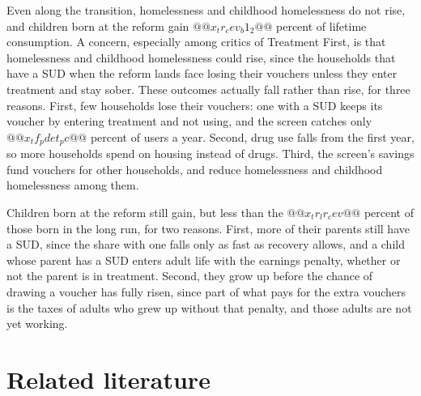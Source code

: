 \documentclass[10pt]{article}
\begin{document}
Even along the transition, homelessness and childhood homelessness do not rise, and children born at the reform gain $@@x_tr_cev_b1_2@@$ percent of lifetime consumption. A concern, especially among critics of Treatment First, is that homelessness and childhood homelessness could rise, since the households that have a SUD when the reform lands face losing their vouchers unless they enter treatment and stay sober. These outcomes actually fall rather than rise, for three reasons. First, few households lose their vouchers: one with a SUD keeps its voucher by entering treatment and not using, and the screen catches only $@@x_tf_pdet_pc@@$ percent of users a year. Second, drug use falls from the first year, so more households spend on housing instead of drugs. Third, the screen's savings fund vouchers for other households, and reduce homelessness and childhood homelessness among them.

Children born at the reform still gain, but less than the $@@x_tr_lr_cev@@$ percent of those born in the long run, for two reasons. First, more of their parents still have a SUD, since the share with one falls only as fast as recovery allows, and a child whose parent has a SUD enters adult life with the earnings penalty, whether or not the parent is in treatment. Second, they grow up before the chance of drawing a voucher has fully risen, since part of what pays for the extra vouchers is the taxes of adults who grew up without that penalty, and those adults are not yet working. 


\section{Related literature}\label{sec:literature}
\end{document}
